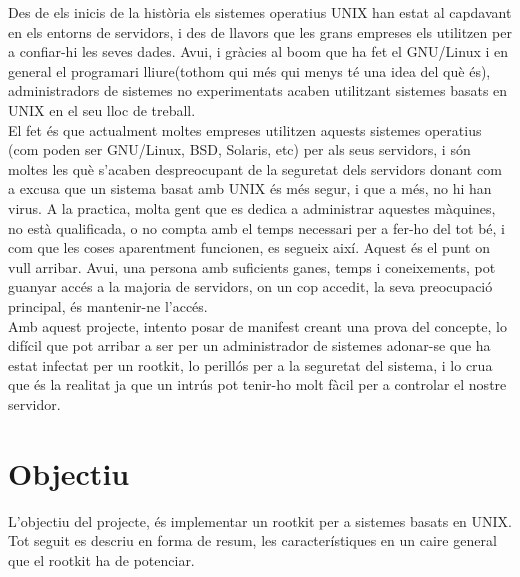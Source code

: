 Des de els inicis de la història els sistemes operatius UNIX han estat al capdavant en els
entorns de servidors, i des de llavors que les grans empreses els utilitzen per a confiar-hi
les seves dades. Avui, i gràcies al boom que ha fet el GNU/Linux i en general el programari lliure(tothom qui més qui
menys té una idea del què és), administradors de sistemes no experimentats acaben
utilitzant sistemes basats en UNIX en el seu lloc de treball. \\
El fet és que actualment moltes empreses utilitzen aquests sistemes operatius (com poden ser
GNU/Linux, BSD, Solaris, etc) per als seus servidors, i són moltes les què s'acaben despreocupant
de la seguretat dels servidors donant com a excusa que un sistema basat amb UNIX és
més segur, i que a més, no hi han virus. A la practica, molta gent que es dedica a
administrar aquestes màquines, no està qualificada, o no compta amb el temps necessari
per a fer-ho del tot bé, i com que les coses aparentment funcionen, es segueix així.
Aquest és el punt on vull arribar. Avui, una persona amb suficients ganes, temps i
coneixements, pot guanyar accés a la majoria de servidors, on un cop accedit, la seva
preocupació principal, és mantenir-ne l'accés.\\


Amb aquest projecte, intento posar de manifest creant una prova del concepte, lo difícil
que pot arribar a ser per un administrador de sistemes adonar-se que ha estat infectat per
un rootkit, lo perillós per a la seguretat del sistema, i lo crua que és la realitat ja que un
intrús pot tenir-ho molt fàcil per a controlar el nostre servidor.

\section{Objectiu}

L'objectiu del projecte, és implementar un rootkit per a sistemes basats en UNIX. Tot seguit
es descriu en forma de resum, les característiques en un caire general que el rootkit ha de potenciar. 

